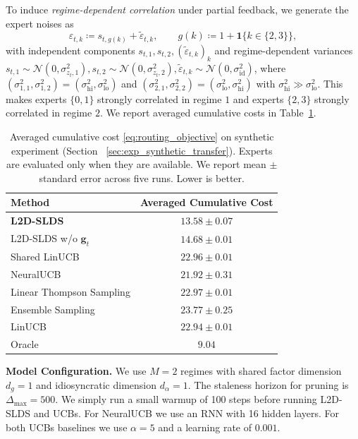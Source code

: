 To induce \emph{regime-dependent correlation} under partial feedback, we generate the expert noises as
\[
\varepsilon_{t,k} \coloneqq s_{t,g(k)} + \tilde\varepsilon_{t,k},
\qquad
g(k)\coloneqq 1+\mathbf{1}\{k\in\{2,3\}\},
\]
with independent components \(s_{t,1},s_{t,2},(\tilde\varepsilon_{t,k})_{k}\) and regime-dependent
variances $s_{t,1}\sim\mathcal{N}(0,\sigma_{z_t,1}^2), s_{t,2}\sim\mathcal{N}(0,\sigma_{z_t,2}^2),
\tilde\varepsilon_{t,k}\sim\mathcal{N}(0,\sigma_{\mathrm{id}}^2)$, where \((\sigma_{1,1}^2,\sigma_{1,2}^2)=(\sigma_{\mathrm{hi}}^2,\sigma_{\mathrm{lo}}^2)\) and
\((\sigma_{2,1}^2,\sigma_{2,2}^2)=(\sigma_{\mathrm{lo}}^2,\sigma_{\mathrm{hi}}^2)\) with
\(\sigma_{\mathrm{hi}}^2\gg\sigma_{\mathrm{lo}}^2\). This makes experts \(\{0,1\}\) strongly
correlated in regime \(1\) and experts \(\{2,3\}\) strongly correlated in regime \(2\). We report
averaged cumulative costs in Table~\ref{tab:exp_avg_costs}.


\begin{table}[ht]
\centering
\small
\setlength{\tabcolsep}{4pt}
\caption{Averaged cumulative cost \eqref{eq:routing_objective} on synthetic experiment (Section~
\ref{sec:exp_synthetic_transfer}). Experts are evaluated only when they are available. We report mean \(\pm\) standard error across five runs. Lower is better.}
\label{tab:exp_avg_costs}
\begin{tabular}{@{}lc@{}}
\toprule
Method & Averaged Cumulative Cost \\
\midrule
\textbf{L2D-SLDS} & \(\mathbf{13.58 \pm 0.07}\)  \\
L2D-SLDS w/o \(\mathbf{g}_t\) & \(14.68 \pm 0.01\)  \\
\midrule
Shared LinUCB & \(22.96 \pm 0.01\)  \\
NeuralUCB & \(21.92 \pm 0.31\)  \\
Linear Thompson Sampling & \(22.97 \pm 0.01\) \\
Ensemble Sampling & \(23.77 \pm 0.25\) \\
LinUCB & \(22.94 \pm 0.01\)  \\
\midrule
Oracle & \(9.04\)\\
\bottomrule
\end{tabular}
\end{table}

\textbf{Model Configuration.}
We use $M = 2$ regimes with shared factor dimension $d_g = 1$ and idiosyncratic dimension $d_\alpha = 1$.
The staleness horizon for pruning is $\Delta_{\max} = 500$. We simply run a small warmup of 100 steps before
running L2D-SLDS and UCBs. For NeuralUCB we use an RNN with 16 hidden layers. For both UCBs baselines we use
$\alpha=5$ and a learning rate of $0.001$.




